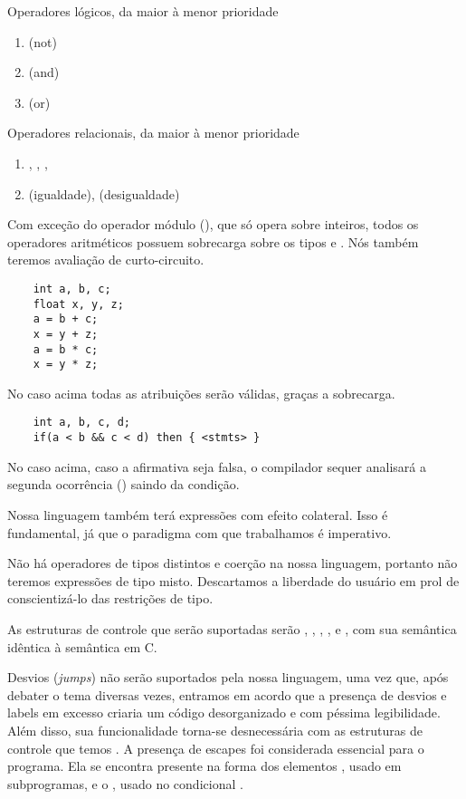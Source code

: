 Operadores lógicos, da maior à menor prioridade
\begin{enumerate}
    \item
    \ic{!} (not)
    \item
    \ic{&&} (and)
    \item
    \ic{||} (or)
\end{enumerate}

Operadores relacionais, da maior à menor prioridade

\begin{enumerate}
    \item
    \ic{>}, \ic{>=}, \ic{<}, \ic{<=}
    \item
    \ic{==} (igualdade), \ic{!=} (desigualdade)
\end{enumerate}

Com exceção do operador módulo (\ic{\%}), que só opera sobre inteiros, todos os
operadores aritméticos possuem sobrecarga sobre os tipos  e .
Nós também teremos avaliação de curto-circuito.

\begin{lstlisting}
    int a, b, c;
    float x, y, z;
    a = b + c;
    x = y + z;
    a = b * c;
    x = y * z;
\end{lstlisting}

No caso acima todas as atribuições serão válidas, graças a sobrecarga.

\begin{lstlisting}
    int a, b, c, d;
    if(a < b && c < d) then { <stmts> }
\end{lstlisting}

No caso acima, caso a afirmativa  seja falsa, o compilador sequer
analisará a segunda ocorrência () saindo da condição.

Nossa
linguagem também terá expressões com efeito colateral. Isso é fundamental, já
que o paradigma com que trabalhamos é imperativo.

Não há operadores de tipos
distintos e coerção na nossa linguagem, portanto não teremos expressões de tipo
misto. Descartamos a liberdade do usuário em prol de conscientizá-lo das
restrições de tipo.

As estruturas de controle que serão suportadas serão
, , , ,  e , com
sua semântica idêntica à semântica em C.

Desvios (\emph{jumps}) não serão
suportados pela nossa linguagem, uma vez que, após debater o tema diversas
vezes, entramos em acordo que a presença de desvios e labels em excesso criaria
um código desorganizado e com péssima legibilidade. Além disso, sua
funcionalidade torna-se desnecessária com as estruturas de controle que temos
.
A presença de escapes foi considerada essencial para o programa. Ela se
encontra presente na forma dos elementos , usado em subprogramas, e
o , usado no condicional .

